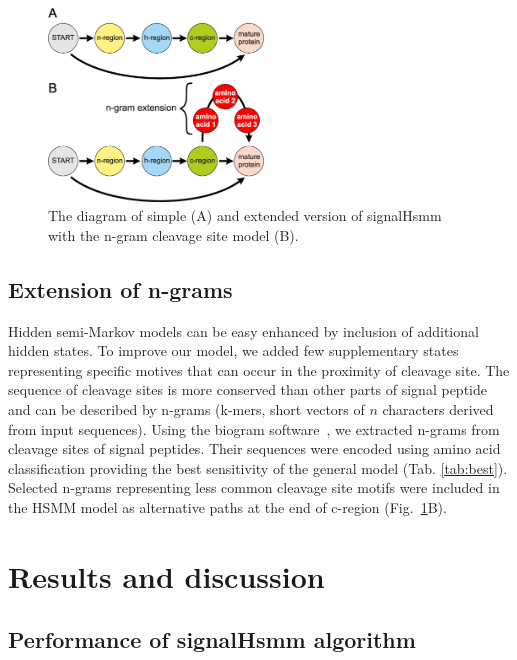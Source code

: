 \documentclass[10pt,letterpaper]{article}
\begin{document}

\begin{figure}[ht]\centering
\includegraphics[width=0.51\textwidth]{figures/HSMMs.eps}
\caption{The diagram of simple (A) and extended version of signalHsmm with the n-gram cleavage site model (B).}
\label{fig:ngramext}
\end{figure}

    
\subsection*{Extension of n-grams}

Hidden semi-Markov models can be easy enhanced by inclusion of additional hidden states. To improve our model, we added few supplementary states representing specific motives that can occur in the proximity of cleavage site. The sequence of cleavage sites is more conserved than other parts of signal peptide~\cite{2004hillerpredisi} and can be described by n-grams (k-mers, short vectors of $n$ characters derived from input sequences). Using the biogram software~\cite{biogramPackage}, we extracted n-grams from cleavage sites of signal peptides. Their sequences were encoded using amino acid classification providing the best sensitivity of the general model (Tab. \ref{tab:best}). Selected n-grams representing less common cleavage site motifs were included in the HSMM model as alternative paths at the end of c-region (Fig.~\ref{fig:ngramext}B).


\section*{Results and discussion}

\subsection*{Performance of signalHsmm algorithm}
\end{document}
